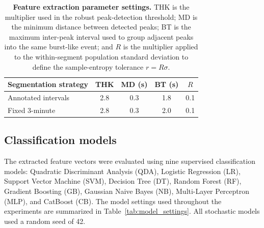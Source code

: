 \documentclass[10pt,letterpaper]{article}
\begin{document}
\begin{table}[!htbp]
\centering
\caption{\textbf{Feature extraction parameter settings.} THK is the multiplier used in the robust peak-detection threshold; MD is the minimum distance between detected peaks; BT is the maximum inter-peak interval used to group adjacent peaks into the same burst-like event; and $R$ is the multiplier applied to the within-segment population standard deviation to define the sample-entropy tolerance $r=R\sigma$.}
\label{tab:param_selection}
\begin{tabular}{lcccc}
\hline
\textbf{Segmentation strategy} &
\textbf{THK} &
\textbf{MD (s)} &
\textbf{BT (s)} &
\textbf{$R$} \\
\hline
Annotated intervals & 2.8 & 0.3 & 1.8 & 0.1 \\
Fixed 3-minute      & 2.8 & 0.3 & 2.0 & 0.1 \\
\hline
\end{tabular}
\end{table}

\subsection*{Classification models}

The extracted feature vectors were evaluated using nine supervised classification models: Quadratic Discriminant Analysis (QDA), Logistic Regression (LR), Support Vector Machine (SVM), Decision Tree (DT), Random Forest (RF), Gradient Boosting (GB), Gaussian Naive Bayes (NB), Multi-Layer Perceptron (MLP), and CatBoost (CB). The model settings used throughout the experiments are summarized in Table~\ref{tab:model_settings}. All stochastic models used a random seed of 42.
\end{document}
